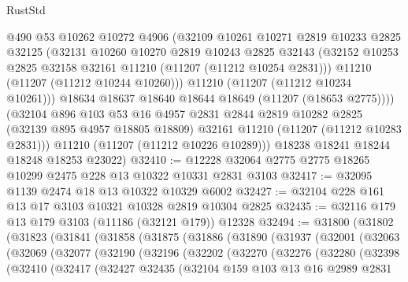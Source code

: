 \begin{lexlean}{RustStd}
\begin{coremodule}
            @490
            @53
            @10262
            @10272
            @4906
            (@32109
              @10261
              @10271
              @2819
              @10233
              @2825
              @32125
              (@32131
                @10260
                @10270
                @2819
                @10243
                @2825
                @32143
                (@32152 @10253 @2825 @32158 @32161 @11210 (@11207 (@11212 @10254 @2831)))
                @11210
                (@11207 (@11212 @10244 @10260)))
              @11210
              (@11207 (@11212 @10234 @10261)))
            @18634
            @18637
            @18640
            @18644
            @18649
            (@11207 (@18653 @2775))))
        (@32104
          @896
          @103
          @53
          @16
          @4957
          @2831
          @2844
          @2819
          @10282
          @2825
          (@32139 @895 @4957 @18805 @18809)
          @32161
          @11210
          (@11207 (@11212 @10283 @2831)))
        @11210
        (@11207 (@11212 @10226 @10289)))
      @18238
      @18241
      @18244
      @18248
      @18253
      @23022)
@32410 := @12228 @32064 @2775 @2775 @18265 @10299 @2475 @228 @13 @10322 @10331 @2831 @3103
@32417 := @32095 @1139 @2474 @18 @13 @10322 @10329 @6002
@32427 := @32104 @228 @161 @13 @17 @3103 @10321 @10328 @2819 @10304 @2825
@32435 := @32116 @179 @13 @179 @3103 (@11186 (@32121 @179)) @12328
@32494 := @31800
    (@31802
      (@31823
        (@31841
          (@31858
            (@31875
              (@31886
                (@31890
                  (@31937
                    (@32001
                      (@32063
                        (@32069
                          (@32077
                            (@32190
                              (@32196
                                (@32202
                                  (@32270
                                    (@32276
                                      (@32280
                                        (@32398
                                          (@32410
                                            (@32417
                                              (@32427
                                                @32435
                                                (@32104
                                                  @159
                                                  @103
                                                  @13
                                                  @16
                                                  @2989
                                                  @2831

\end{coremodule}
\end{lexlean}
